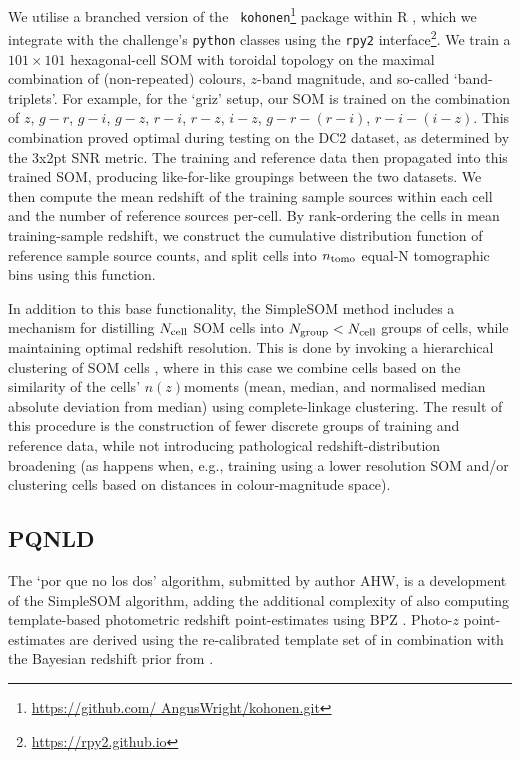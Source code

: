 \documentclass[twocolumn,twocolappendix]{aastex63}
\begin{document}
We utilise a branched version of the {\tt
kohonen}\footnote{\url{https://github.com/ AngusWright/kohonen.git}} package
\citep{Wright/etal:2020b, Wehrens/Kruisselbrink:2018, Wehrens/Lutgarde:2007}
within R \citep{R}, which we integrate with  the challenge's {\tt python}
classes using the {\tt rpy2} interface\footnote{\url{https://rpy2.github.io}}. 
We train a $101 \times 101$ hexagonal-cell SOM with toroidal topology on the
maximal combination of (non-repeated) colours, $z$-band magnitude, and so-called
`band-triplets'. For example, for the `griz' setup, our SOM is trained on the
combination of  $z$, $g-r$, $g-i$, $g-z$, $r-i$, $r-z$, $i-z$, $g-r-(r-i)$,
$r-i-(i-z)$. This combination proved optimal during testing on the DC2 dataset,
as determined by the 3x2pt SNR metric. The training and reference data then
propagated into this trained SOM, producing like-for-like groupings between the
two datasets. We then compute the mean redshift of the training sample sources
within each cell and the number of reference sources per-cell. By rank-ordering
the cells in mean training-sample redshift, we construct the cumulative
distribution function of reference sample source counts, and split cells into
${n_{\rm tomo}}$ equal-N tomographic bins using this function. 

In addition to this base functionality, the SimpleSOM method includes a
mechanism for distilling $N_{\rm cell}$ SOM cells into $N_{\rm group}<N_{\rm
cell}$ groups of cells, while maintaining optimal redshift resolution. This is
done by invoking a hierarchical clustering of SOM cells \citep[see Appendix B of
][]{Wright/etal:2020a}, where in this case we combine cells based on the
similarity of the cells' $n(z) $moments (mean, median, and normalised median absolute
deviation from median) using complete-linkage clustering. The result of this
procedure is the construction of fewer discrete groups of training and reference
data, while not introducing pathological redshift-distribution broadening (as
happens when, e.g., training using a lower resolution SOM and/or clustering
cells based on distances in colour-magnitude space). 

\subsection{PQNLD} \label{sec:pqnld}

The `por que no los dos' algorithm, submitted by author AHW, is a development of the SimpleSOM algorithm, adding the 
additional complexity of also computing template-based photometric redshift point-estimates using BPZ 
\citep{Benitez:2000}. Photo-$z$ point-estimates are derived using the re-calibrated 
template set of \cite{Capak:2004} in combination with 
the Bayesian redshift prior from \cite{Raichoor/etal:2014}. 
\end{document}
